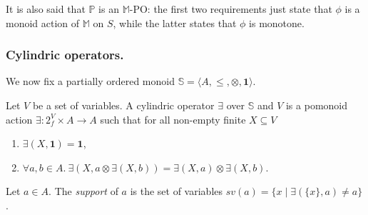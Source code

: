 \documentclass{llncs}
\newcommand{\comment}[1]{}
\def\monid{{\mathbf 0}}
\def\monop{\otimes}
\def\monid{\mathbf{1}}
\begin{document}
It is also said that $\mathbb{P}$ is an $\mathbb{M}$-PO: the first two requirements just state
that $\phi$ is a monoid action of $\mathbb{M}$ on $S$, while the latter states that $\phi$ is monotone.

\comment{
\begin{remark}
Note that, since $\phi$ is monotone, it behaves correctly on any SL and preserves its LUBs: given an SL $\mathbb{M} = \langle A, \leq, \monop, \monid \rangle$, a finite subset $X \subseteq A$ and a partial order $\mathbb{P} = \langle S, \leq \rangle$, we have $\bigvee \{ \phi(x,s) \mid x \in X \} = \phi(\bigvee X,s)$.
\end{remark}
\marginpar{davvero? Fai attenzione}
}

\subsubsection{Cylindric operators.}
We now fix a partially ordered monoid $\mathbb{S} = \langle A, \leq, \monop, \monid \rangle$.

\begin{definition}[cylindrification]\label{cyli}
        Let $V$ be a set of variables. 
	A cylindric operator $\exists$ over $\mathbb{S}$ and $V$ is a pomonoid action
	$\exists: 2_f^V \times A \rightarrow A$ such that for all non-empty finite $X \subseteq V$
	\begin{enumerate}
	     \item $\exists(X, \monid) = \monid$,
	     \item $\forall a,b \in A.\ \exists(X, a \monop \exists(X, b)) = \exists(X, a) \monop \exists(X, b)$.
	\end{enumerate}
	
	\noindent Let $a \in A$. The \emph{support} of $a$ is the set of variables $sv(a) = \{ x \mid \exists(\{x\}, a) \neq a\}$. 
\end{definition}
\end{document}
